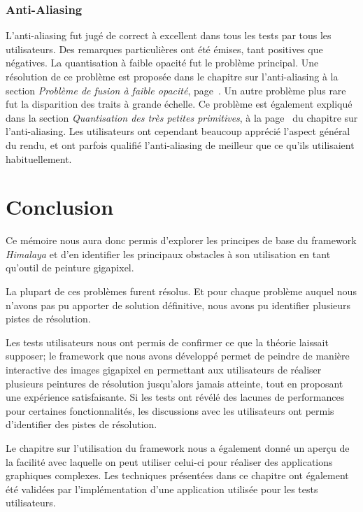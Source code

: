 		\subsection{Anti-Aliasing}
		L'anti-aliasing fut jugé de correct à excellent dans tous les tests par tous les utilisateurs. Des remarques particulières ont été émises,
		tant positives que négatives. La quantisation à faible opacité fut le problème principal. Une résolution de ce problème est
		proposée dans le chapitre sur l'anti-aliasing à la section \emph{Problème de fusion à faible opacité}, page~\pageref{fopac}. Un autre problème plus rare fut la disparition des traits à grande échelle. Ce problème est
		également expliqué dans la section \emph{Quantisation des très petites primitives}, à la page~\pageref{tpquan} du chapitre sur l'anti-aliasing.  Les utilisateurs ont cependant beaucoup apprécié l'aspect général du rendu, et 
		ont parfois qualifié l'anti-aliasing de meilleur que ce qu'ils utilisaient habituellement.  
		
\chapter{Conclusion}
	Ce mémoire nous aura donc permis d'explorer les principes de base du framework \emph{Himalaya} et 
	d'en identifier les principaux obstacles à son utilisation en tant qu'outil de peinture gigapixel.
	
	La plupart de ces problèmes furent résolus. Et pour chaque problème auquel nous n'avons pas pu apporter
	de solution définitive, nous avons pu identifier plusieurs pistes de résolution.

	Les tests utilisateurs nous ont permis de confirmer ce que la théorie laissait supposer;
	le framework que nous avons développé permet de peindre de manière interactive des images gigapixel en permettant
	aux utilisateurs de réaliser plusieurs peintures de résolution jusqu'alors jamais atteinte, tout en proposant une
	expérience satisfaisante. Si les tests ont révélé des lacunes de performances pour certaines fonctionnalités, 
	les discussions avec les utilisateurs ont permis d'identifier des pistes de résolution.


	Le chapitre sur l'utilisation du framework nous a également donné un aperçu de la facilité avec laquelle on peut 
	utiliser celui-ci pour réaliser des applications graphiques complexes. Les techniques présentées dans ce chapitre ont
	également été validées par l'implémentation d'une application utilisée pour les tests utilisateurs.


